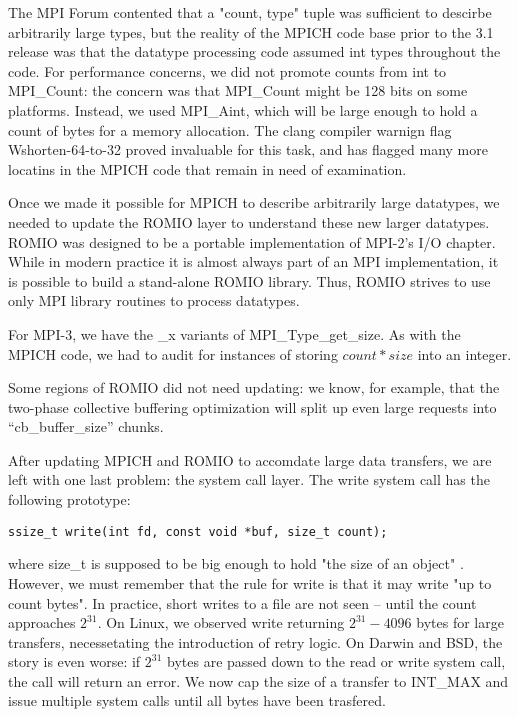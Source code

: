
The MPI Forum contented that a "count, type" tuple was sufficient to descirbe
arbitrarily large types, but the reality of the MPICH code base prior to the
3.1 release was that the datatype processing code assumed int types throughout
the code.   For performance concerns, we did not promote counts from int to
MPI\_Count: the concern was that MPI\_Count might be 128 bits on some
platforms.  Instead, we used MPI\_Aint, which will be large enough to hold a
count of bytes for a memory allocation.  The clang compiler warnign flag
Wshorten-64-to-32 proved invaluable for this task, and has flagged many more
locatins in the MPICH code that remain in need of examination.


Once we made it possible for MPICH to describe arbitrarily large datatypes, we
needed to update the ROMIO layer to understand these new larger datatypes.
ROMIO \cite{romio} was designed to be a portable implementation of MPI-2's I/O
chapter.  While in modern practice it is almost always part of an MPI
implementation, it is possible to build a stand-alone ROMIO library.  Thus,
ROMIO strives to use only MPI library routines to process datatypes.

For MPI-3, we have the \_x variants of MPI\_Type\_get\_size.  As with the MPICH
code, we had to audit for instances of storing $count * size$ into an
integer.

Some regions of ROMIO did not need updating: we know, for example, that the
two-phase collective buffering optimization will split up even large requests
into ``cb\_buffer\_size'' chunks.


After updating MPICH and ROMIO to accomdate large data transfers, we are left
with one last problem: the system call layer.  The write system call has the
following prototype:

\begin{verbatim}
ssize_t write(int fd, const void *buf, size_t count);
\end{verbatim}

where size\_t is supposed to be big enough to hold "the size of an object"
\cite{posix}.  However, we must remember that the rule for write is that it may
write "up to count bytes".  In practice, short writes to a file are not seen --
until the count approaches $2^31$.  On Linux, we observed write returning
$2^31-4096$ bytes for large transfers, necessetating the introduction of retry
logic.  On Darwin and BSD, the story is even worse: if $2^31$ bytes are passed
down to the read or write system call, the call will return an error.  We now
cap the size of a transfer to INT\_MAX and issue multiple system calls until
all bytes have been trasfered.
